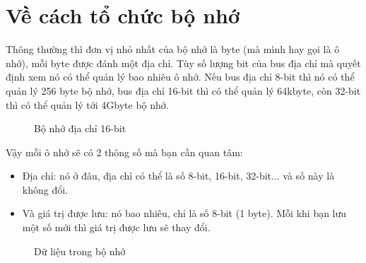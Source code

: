 \section{Về cách tổ chức bộ nhớ}

Thông thường thì đơn vị nhỏ nhất của bộ nhớ là byte (mà mình hay gọi là ô nhớ), mỗi byte được đánh một địa chỉ. Tùy số lượng bit của bus địa chỉ mà quyết định xem nó có thể quản lý bao nhiêu ô nhớ. Nếu bus địa chỉ 8-bit thì nó có thể quản lý 256 byte bộ nhớ, bus địa chỉ 16-bit thì có thể quản lý 64kbyte, còn 32-bit thì có thể quản lý tới 4Gbyte bộ nhớ. 

\begin{figure}[h!]
\centering

\caption{Bộ nhớ địa chỉ 16-bit} 
\end{figure}

Vậy mỗi ô nhớ sẽ có 2 thông số mà bạn cần quan tâm: 
\begin{itemize}
    \item Địa chỉ: nó ở đâu, địa chỉ có thể là số 8-bit, 16-bit, 32-bit... và số này là không đổi.
    \item Và giá trị được lưu: nó bao nhiêu, chỉ là số 8-bit (1 byte). Mỗi khi bạn lưu một số mới thì giá trị được lưu sẽ thay đổi.
\end{itemize}

\begin{figure}[h!]
\centering
{}
\caption{Dữ liệu trong bộ nhớ} %
\end{figure}


